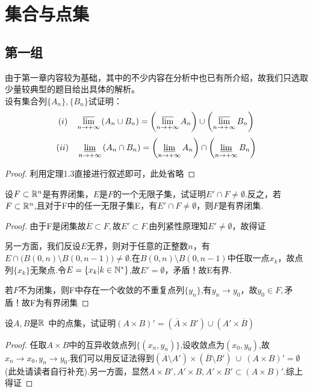 \chapter{集合与点集}
\section{第一组}
由于第一章内容较为基础，其中的不少内容在分析中也已有所介绍，故我们只选取少量较典型的题目给出具体的解析。\\




设有集合列$\{A_n\},\{B_n\}$试证明：$$(i)\quad \varlimsup\limits_{n \to +\infty}\left(A_n\cup B_n \right)=\left(\varlimsup\limits_{n \to +\infty}A_n \right)\cup \left(\varlimsup\limits_{n \to +\infty} B_n \right) $$
$$(ii)\quad \varliminf\limits_{n \to +\infty}\left(A_n\cap B_n \right)=\left(\varliminf\limits_{n \to +\infty}A_n \right)\cap \left(\varliminf\limits_{n \to +\infty} B_n \right) $$
\begin{proof}
利用定理1.3直接进行叙述即可，此处省略
\end{proof}

设$F\subset \mathbb{R}^{n}$是有界闭集，$E$是$F$的一个无限子集，试证明$E'\cap F\neq \emptyset$.反之，若$F\subset \mathbb{R}^{n}$,且对于F中的任一无限子集E，有$E'\cap F\neq \emptyset$，则$F$是有界闭集.
\begin{proof}
	由于F是闭集故$\overline{E}\subset F,$故$E'\subset F.$由列紧性原理知$E'\neq\emptyset$，故得证\par 
	另一方面，我们反设$E$无界，则对于任意的正整数$n$，有$E\cap \big(B(0,n)\setminus B(0,n-1) \big)\neq \emptyset $.在$B(0,n)\setminus B(0,n-1)$中任取一点$x_k$，故点列$\{x_k\}$无聚点.令$E=\{x_k|k\in \mathbb{N}^{*}\}$,故$E'=\emptyset$，矛盾！故E有界.\par 
	若$F$不为闭集，则F中存在一个收敛的不重复点列$\{y_n\}$,有$y_n\to y_0$，故$y_0\in F,$矛盾！故F为有界闭集
\end{proof}


设$A,B$是$\R{R}{\ }$中的点集，试证明$(A\times B)'=(\overline{A}\times B')\cup (A'\times\overline{B})$
\begin{proof}
	任取$A\times B$中的互异收敛点列$\{(x_n,y_n)\}$,设收敛点为$(x_0,y_0)$,故$x_n\to x_0,y_n\to y_0$.我们可以用反证法得到$(\overline{A}\setminus A')\times (\overline{B}\setminus B')\ \cup\  (A\times B)'=\emptyset$(此处请读者自行补充).另一方面，显然$A\times B',A'\times B,A'\times B'\subset (A\times B)'.$综上得证
\end{proof}


